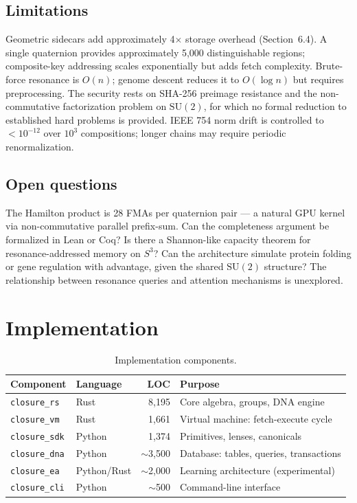 \documentclass[12pt,a4paper]{article}
\begin{document}
\subsection{Limitations}

Geometric sidecars add approximately 4$\times$ storage overhead (Section~6.4). A single quaternion provides approximately 5,000 distinguishable regions; composite-key addressing scales exponentially but adds fetch complexity. Brute-force resonance is $O(n)$; genome descent reduces it to $O(\log n)$ but requires preprocessing. The security rests on SHA-256 preimage resistance and the non-commutative factorization problem on $\mathrm{SU}(2)$, for which no formal reduction to established hard problems is provided. IEEE 754 norm drift is controlled to $< 10^{-12}$ over $10^3$ compositions; longer chains may require periodic renormalization.

\subsection{Open questions}

The Hamilton product is 28 FMAs per quaternion pair --- a natural GPU kernel via non-commutative parallel prefix-sum. Can the completeness argument be formalized in Lean or Coq? Is there a Shannon-like capacity theorem for resonance-addressed memory on $S^3$? Can the architecture simulate protein folding or gene regulation with advantage, given the shared $\mathrm{SU}(2)$ structure? The relationship between resonance queries and attention mechanisms \cite{vaswani2017} is unexplored.


\section{Implementation}

\begin{table}[h]
\centering
\small
\begin{tabular}{@{}llrl@{}}
\toprule
Component & Language & LOC & Purpose \\
\midrule
\texttt{closure\_rs} & Rust & 8,195 & Core algebra, groups, DNA engine \\
\texttt{closure\_vm} & Rust & 1,661 & Virtual machine: fetch-execute cycle \\
\texttt{closure\_sdk} & Python & 1,374 & Primitives, lenses, canonicals \\
\texttt{closure\_dna} & Python & $\sim$3,500 & Database: tables, queries, transactions \\
\texttt{closure\_ea} & Python/Rust & $\sim$2,000 & Learning architecture (experimental) \\
\texttt{closure\_cli} & Python & $\sim$500 & Command-line interface \\
\bottomrule
\end{tabular}
\caption{Implementation components.}
\end{table}
\end{document}
